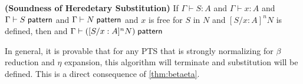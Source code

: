 \begin{theorem}
\textbf{(Soundness of Heredetary Substitution)}
If  $\Gamma \vdash S : A$ 
and $\Gamma \vdash x : A$ 
and $\Gamma \vdash S \; \mathsf{pattern}$ 
and $\Gamma \vdash N \; \mathsf{pattern}$ 
and $x$ is free for $S$ in $N$
and $[S / x : A]^n N$ is defined, 
then
and $\Gamma \vdash ([S / x : A]^n N) \; \mathsf{pattern}$ 
\label{thm:hed-sound}
\end{theorem}

In general, it is provable that for any PTS that is strongly normalizing for $\beta$ reduction and 
$\eta$ expansion, this algorithm will terminate and substitution will be defined.  
This is a direct consequence of \ref{thm:betaeta}.
